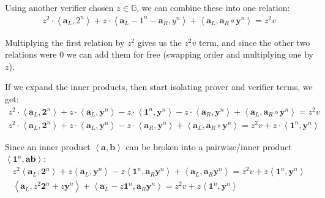 \documentclass{article}
\begin{document}
Using another verifier chosen $z \in \mathbb{G}$, we can combine these into one relation:
\begin{align}
  z^2 \cdot \left<\textbf{a}_L, 2^n\right> + z \cdot \left<\textbf{a}_L - 1^n - \textbf{a}_R, y^n\right> + \left<\textbf{a}_L, \textbf{a}_R \circ \textbf{y}^n\right> = z^2 v
\end{align}

Multiplying the first relation by $z^2$ gives us the $z^2 v$ term, and since the other two relations were $0$ we can add them for free (swapping order and multiplying one by $z$).

If we expand the inner products, then start isolating prover and verifier terms, we get:
\begin{align}
  z^2 \cdot \left<\textbf{a}_L, \textbf{2}^n\right> + z \cdot \left<\textbf{a}_L, \textbf{y}^n\right> - z \cdot \left<\textbf{1}^n, \textbf{y}^n\right> - z \cdot \left<\textbf{a}_R, \textbf{y}^n\right> + \left<\textbf{a}_L, \textbf{a}_R \circ \textbf{y}^n\right> = z^2 v\\
  z^2 \cdot \left<\textbf{a}_L, \textbf{2}^n\right> + z \cdot \left<\textbf{a}_L, \textbf{y}^n\right> - z \cdot \left<\textbf{a}_R, \textbf{y}^n\right> + \left<\textbf{a}_L, \textbf{a}_R \circ \textbf{y}^n\right> = z^2 v + z \cdot \left<\textbf{1}^n, \textbf{y}^n\right>
\end{align}

Since an inner product $\left<\textbf{a}, \textbf{b}\right>$ can be broken into a pairwise/inner product $\left<\textbf{1}^n, \textbf{a} \textbf{b}\right>$:
\begin{align}
  z^2 \left<\textbf{a}_L, \textbf{2}^n\right> + z \left<\textbf{a}_L, \textbf{y}^n\right> - z \left<\textbf{1}^n, \textbf{a}_R \textbf{y}^n\right> + \left<\textbf{a}_L,  \textbf{a}_R \textbf{y}^n\right> = z^2 v + z \left<\textbf{1}^n, \textbf{y}^n\right>\\
  \left<\textbf{a}_L, z^2 \textbf{2}^n + z \textbf{y}^n\right> + \left<\textbf{a}_L - z \textbf{1}^n, \textbf{a}_R \textbf{y}^n\right> = z^2 v + z \left<\textbf{1}^n, \textbf{y}^n\right>
\end{align}
\end{document}
